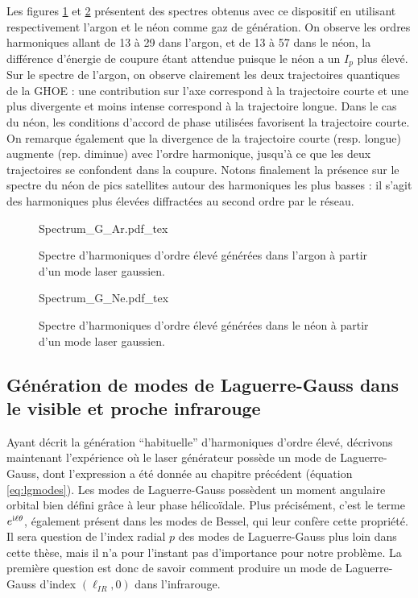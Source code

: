 Les figures \ref{Fig:SpectrumGAr} et \ref{Fig:SpectrumGNe} présentent des spectres obtenus avec ce dispositif en utilisant respectivement l'argon et le néon comme gaz de génération. On observe les ordres harmoniques allant de 13 à 29 dans l'argon, et de 13 à 57 dans le néon, la différence d'énergie de coupure étant attendue puisque le néon a un $I_p$ plus élevé. Sur le spectre de l'argon, on observe clairement les deux trajectoires quantiques de la GHOE : une contribution sur l'axe correspond à la trajectoire courte et une plus divergente et moins intense correspond à la trajectoire longue. Dans le cas du néon, les conditions d'accord de phase utilisées favorisent la trajectoire courte. On remarque également que la divergence de la trajectoire courte (resp. longue) augmente (rep. diminue) avec l'ordre harmonique, jusqu'à ce que les deux trajectoires se confondent dans la coupure. Notons finalement la présence sur le spectre du néon de pics satellites autour des harmoniques les plus basses : il s'agit des harmoniques plus élevées diffractées au second ordre par le réseau.
\begin{figure}[!ht]
\centering
\def\svgwidth{\columnwidth}
{Spectrum_G_Ar.pdf_tex}
\caption{Spectre d'harmoniques d'ordre élevé générées dans l'argon à partir d'un mode laser gaussien.}
\label{Fig:SpectrumGAr}
\end{figure}
\begin{figure}[!ht]
\centering
\def\svgwidth{\columnwidth}
{Spectrum_G_Ne.pdf_tex}
\caption{Spectre d'harmoniques d'ordre élevé générées dans le néon à partir d'un mode laser gaussien.}
\label{Fig:SpectrumGNe}
\end{figure}

\subsection{Génération de modes de Laguerre-Gauss dans le visible et proche infrarouge}
Ayant décrit la génération ``habituelle'' d'harmoniques d'ordre élevé, décrivons maintenant l'expérience où le laser générateur possède un mode de Laguerre-Gauss, dont l'expression a été donnée au chapitre précédent (équation \ref{eq:lgmodes}). Les modes de Laguerre-Gauss possèdent un moment angulaire orbital bien défini grâce à leur phase hélicoïdale. Plus précisément, c'est le terme $e^{\mathrm{i}\ell\theta}$, également présent dans les modes de Bessel, qui leur confère cette propriété. Il sera question de l'index radial $p$ des modes de Laguerre-Gauss plus loin dans cette thèse, mais il n'a pour l'instant pas d'importance pour notre problème. La première question est donc de savoir comment produire un mode de Laguerre-Gauss d'index $(\ell_{IR},0)$ dans l'infrarouge. 

